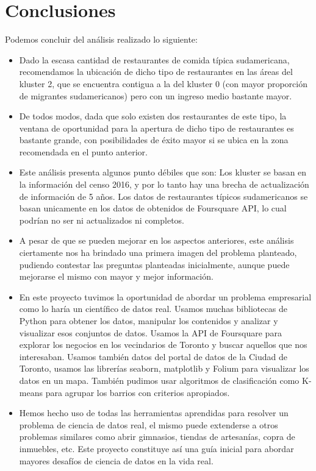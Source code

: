 \documentclass[10pt,a4paper,arial, spanish]{article}
\begin{document}
\section{Conclusiones}
Podemos concluir del análisis realizado lo siguiente:
\begin{itemize}
	\item Dado la escasa cantidad de restaurantes de comida típica sudamericana, recomendamos la ubicación de dicho tipo de restaurantes en las áreas del kluster 2, que se encuentra contigua a la del kluster 0 (con mayor proporción de migrantes sudamericanos) pero con un ingreso medio bastante mayor.
	\item De todos modos, dada que solo existen dos restaurantes de este tipo, la ventana de oportunidad para la apertura de dicho tipo de restaurantes es bastante grande, con posibilidades de éxito mayor si se ubica en la zona recomendada en el punto anterior.
	\item Este análisis presenta algunos punto débiles que son:
	\subitem Los kluster se basan en la información del censo 2016, y por lo tanto hay una brecha de actualización de información de 5 años.
	\subitem Los datos de restaurantes típicos sudamericanos se basan unicamente en los datos de obtenidos de Foursquare API, lo cual podrían no ser ni actualizados ni completos.
	\item A pesar de que se pueden mejorar en los aspectos anteriores, este análisis ciertamente nos ha brindado una primera imagen del problema planteado, pudiendo contestar las preguntas planteadas inicialmente, aunque puede mejorarse el mismo con mayor y mejor información.
	\item En este proyecto tuvimos la oportunidad de abordar un problema empresarial como lo haría un científico de datos real. Usamos muchas bibliotecas de Python para obtener los datos, manipular los contenidos y analizar y visualizar esos conjuntos de datos. Usamos la API de Foursquare para explorar los negocios en los vecindarios de Toronto y buscar aquellos que nos interesaban. Usamos también datos del portal de datos de la Ciudad de Toronto, usamos las librerías seaborn, matplotlib y Folium para visualizar los datos en un mapa. También pudimos usar algoritmos de clasificación como K-means para agrupar los barrios con criterios apropiados.
	\item Hemos hecho uso de todas las herramientas aprendidas para resolver un problema de ciencia de datos real, el mismo puede extenderse a otros problemas similares como abrir gimnasios, tiendas de artesanías, copra de inmuebles, etc. Este proyecto constituye así una guía inicial para abordar mayores desafíos de ciencia de datos en la vida real.
\end{itemize} 
\end{document}
